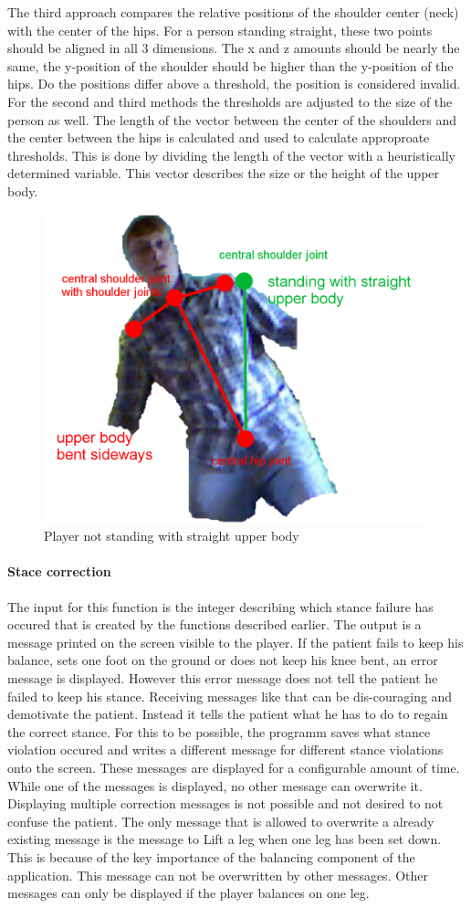 The third approach compares the relative positions of the shoulder center (neck) with the center of the hips. For a person standing straight, these two points should be aligned in all 3 dimensions. The x and z amounts should be nearly the same, the y-position of the shoulder should be higher than the y-position of the hips. Do the positions differ above a threshold, the position is considered invalid.
For the second and third methods the thresholds are adjusted to the size of the person as well. The length of the vector between the center of the shoulders and the center between the hips is calculated and used to calculate approproate thresholds. This is done by dividing the length of the vector with a heuristically determined variable. This vector describes the size or the height of the upper body.
\begin{figure}
\centering
\includegraphics[width=0.7\linewidth]{figures/3-IMR/rehabilitationSraight}
\caption{Player not standing with straight upper body}
\label{fig:rehabilitationSraight}
\end{figure}

\paragraph{Stace correction}
The input for this function is the integer describing which stance failure has occured that is created by the functions described earlier. The output is a message printed on the screen visible to the player.
If the patient fails to keep his balance, sets one foot on the ground or does not keep his knee bent, an error message is displayed. However this error message does not tell the patient he failed to keep his stance. Receiving messages like that can be dis-couraging and demotivate the patient. Instead it tells the patient what he has to do to regain the correct stance. For this to be possible, the programm saves what stance violation occured and writes a different message for different stance violations onto the screen. These messages are displayed for a configurable amount of time. While one of the messages is displayed, no other message can overwrite it. Displaying multiple correction messages is not possible and not desired to not confuse the patient. The only message that is allowed to overwrite a already existing message is the message to Lift a leg when one leg has been set down. This is because of the key importance of the balancing component of the application. This message can not be overwritten by other messages. Other messages can only be displayed if the player balances on one leg.

